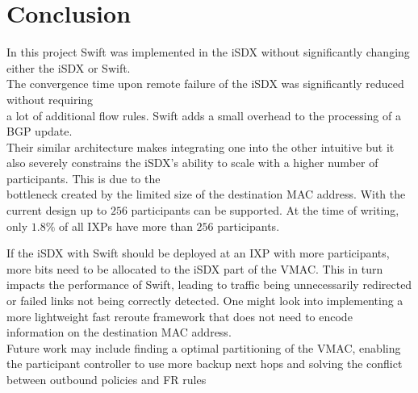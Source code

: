 \chapter{\label{chapter7}Conclusion}
In this project Swift was implemented in the iSDX without significantly changing either the iSDX or Swift.\\
The convergence time upon remote failure of the iSDX was significantly reduced without requiring \\ a lot of additional flow rules. Swift adds a small overhead to the processing of a BGP update. \\
Their similar architecture makes integrating one into the other intuitive but it also severely constrains the iSDX's ability to scale with a higher number of participants. This is due to the\\bottleneck created by the limited size of the destination MAC address. With the current design up to $256$ participants can be supported. At the time of writing, only $1.8\%$ of all IXPs have more than $256$ participants. \cite{ixps} 


If the iSDX with Swift should be deployed at an IXP with more participants, more bits need to be allocated to the iSDX part of the VMAC. This in turn impacts the performance of Swift, leading to traffic being unnecessarily redirected or failed links not being correctly detected. One might look into implementing a more lightweight fast reroute framework that does not need to encode information on the destination MAC address. \\
Future work may include finding a optimal partitioning of the VMAC, enabling the participant controller to use more backup next hops and solving the conflict between outbound policies and FR rules